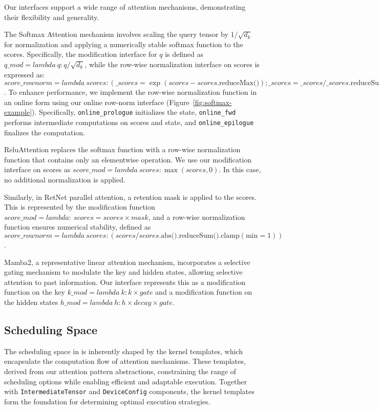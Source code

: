 Our interfaces support a wide range of attention mechanisms, demonstrating their flexibility and generality.

The Softmax Attention mechanism involves scaling the query tensor by $1/\sqrt{d_k}$ for normalization and applying a numerically stable softmax function to the scores. Specifically, the modification interface for $q$ is defined as $q\_mod = lambda\  q: q / \sqrt{d_k}$, while the row-wise normalization interface on scores is expressed as: $score\_rownorm = lambda\ scores: (\_scores = \exp(scores - scores.\text{reduceMax()}); \_scores = \_scores / \_scores.\text{reduceSum()})$. To enhance performance, we implement the row-wise normalization function in an online form using our online row-norm interface (Figure~\ref{fig:softmax-example}). Specifically, \texttt{online\_prologue} initializes the state, \texttt{online\_fwd} performs intermediate computations on scores and state, and \texttt{online\_epilogue} finalizes the computation.

ReluAttention replaces the softmax function with a row-wise normalization function that contains only an elementwise operation. We use our modification interface on scores as $score\_mod = lambda\ scores: \max(scores, 0)$. In this case, no additional normalization is applied.

Similarly, in RetNet parallel attention, a retention mask is applied to the scores. This is represented by the modification function $ score\_mod = lambda:\ scores = scores \times mask$, and a row-wise normalization function ensures numerical stability, defined as $score\_rownorm = lambda\ scores:  (scores / scores.\text{abs()}.\text{reduceSum()}.\text{clamp}(\text{min}=1))$.

Mamba2, a representative linear attention mechanism, incorporates a selective gating mechanism to modulate the key and hidden states, allowing selective attention to past information. Our interface represents this as a modification function on the key $k\_mod = lambda\ k: k \times gate$ and a modification function on the hidden states $h\_mod = lambda\ h: h \times decay \times gate$.


\subsection{Scheduling Space}
The scheduling space in \oursys{} is inherently shaped by the kernel templates, which encapsulate the computation flow of attention mechanisms. These templates, derived from our attention pattern abstractions, constraining the range of scheduling options while enabling efficient and adaptable execution. Together with \texttt{IntermediateTensor} and \texttt{DeviceConfig} components, the kernel templates form the foundation for determining optimal execution strategies.

